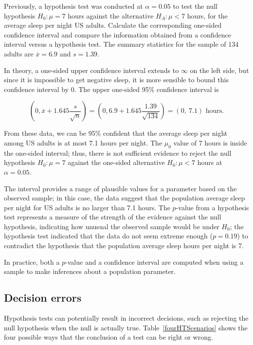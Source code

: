\begin{example}
{Previously, a hypothesis test was conducted at $\alpha = 0.05$ to test the null hypothesis $H_0: \mu = 7$ hours against the alternative $H_A: \mu < 7$ hours, for the average sleep per night US adults. Calculate the corresponding one-sided confidence interval and compare the information obtained from a confidence interval versus a hypothesis test. The summary statistics for the sample of 134 adults are $\overline{x} = 6.9$ and $s = 1.39$.}	

In theory, a one-sided upper confidence interval extends to $\infty$ on the left side, but since it is impossible to get negative sleep, it is more sensible to bound this confidence interval by 0.  The upper one-sided 95\% confidence interval is

\[(0, \overline{x} + 1.645 \dfrac{s}{\sqrt{n}}) = (0, 6.9 + 1.645\dfrac{1.39}{\sqrt{134}}) = (0, \ 7.1)\text{ hours.} \]

From these data, we can be 95\% confident that the average sleep per night among US adults is at most 7.1 hours per night. The $\mu_0$ value of 7 hours is inside the one-sided interval; thus, there is not sufficient evidence to reject the null hypothesis $H_0: \mu = 7$ against the one-sided alternative $H_0: \mu < 7$ hours at $\alpha = 0.05$. 

The interval provides a range of plausible values for a parameter based on the observed sample; in this case, the data suggest that the population average sleep per night for US adults is no larger than 7.1 hours. The $p$-value from a hypothesis test represents a measure of the strength of the evidence against the null hypothesis, indicating how unusual the observed sample would be under $H_0$; the hypothesis test indicated that the data do not seem extreme enough ($p = 0.19$) to contradict the hypothesis that the population average sleep hours per night is 7. 

In practice, both a $p$-value and a confidence interval are computed when using a sample to make inferences about a population parameter.

\end{example}

\subsection{Decision errors}

Hypothesis tests can potentially result in incorrect decisions, such as rejecting the null hypothesis when the null is actually true. Table~\ref{fourHTScenarios} shows the four possible ways that the conclusion of a test can be right or wrong.


